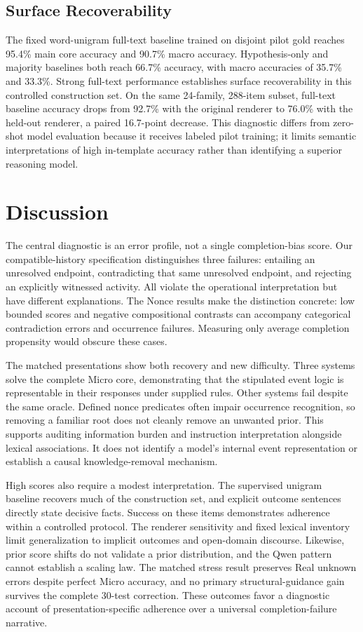 \documentclass[sigconf,anonymous,review]{acmart}
\begin{document}
\subsection{Surface Recoverability}
The fixed word-unigram full-text baseline trained on disjoint pilot gold reaches 95.4\% main core accuracy and 90.7\% macro accuracy. Hypothesis-only and majority baselines both reach 66.7\% accuracy, with macro accuracies of 35.7\% and 33.3\%. Strong full-text performance establishes surface recoverability in this controlled construction set. On the same 24-family, 288-item subset, full-text baseline accuracy drops from 92.7\% with the original renderer to 76.0\% with the held-out renderer, a paired 16.7-point decrease. This diagnostic differs from zero-shot model evaluation because it receives labeled pilot training; it limits semantic interpretations of high in-template accuracy rather than identifying a superior reasoning model.

\section{Discussion}
The central diagnostic is an error profile, not a single completion-bias score. Our compatible-history specification distinguishes three failures: entailing an unresolved endpoint, contradicting that same unresolved endpoint, and rejecting an explicitly witnessed activity. All violate the operational interpretation but have different explanations. The Nonce results make the distinction concrete: low bounded scores and negative compositional contrasts can accompany categorical contradiction errors and occurrence failures. Measuring only average completion propensity would obscure these cases.

The matched presentations show both recovery and new difficulty. Three systems solve the complete Micro core, demonstrating that the stipulated event logic is representable in their responses under supplied rules. Other systems fail despite the same oracle. Defined nonce predicates often impair occurrence recognition, so removing a familiar root does not cleanly remove an unwanted prior. This supports auditing information burden and instruction interpretation alongside lexical associations. It does not identify a model's internal event representation or establish a causal knowledge-removal mechanism.

High scores also require a modest interpretation. The supervised unigram baseline recovers much of the construction set, and explicit outcome sentences directly state decisive facts. Success on these items demonstrates adherence within a controlled protocol. The renderer sensitivity and fixed lexical inventory limit generalization to implicit outcomes and open-domain discourse. Likewise, prior score shifts do not validate a prior distribution, and the Qwen pattern cannot establish a scaling law. The matched stress result preserves Real unknown errors despite perfect Micro accuracy, and no primary structural-guidance gain survives the complete 30-test correction. These outcomes favor a diagnostic account of presentation-specific adherence over a universal completion-failure narrative.
\end{document}
